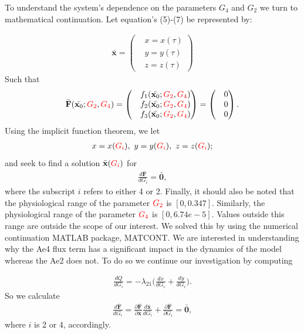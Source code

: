 \documentclass{svjour3}
\begin{document}
 To understand the system's dependence on the parameters $G_4$ and $G_2$ we turn to mathematical continuation. Let equation's (5)-(7) be represented by:\par
{\footnotesize
\begin{align*}
\bar{\textbf{x}}=
\begin{pmatrix}
& x=x(\tau) \\
& y=y(\tau) \\
& z=z(\tau)
\end{pmatrix}
\end{align*}}
Such that 
{\footnotesize
\begin{align*}
\bar{\textbf{F}}(\bar{\textbf{x}_0};{\color{red}G_{2}},{\color{red}G_{4}})=
\begin{pmatrix}
& f_1(\bar{\textbf{x}_0};{\color{red}G_{2}},{\color{red}G_{4}}) \\
& f_2(\bar{\textbf{x}_0};{\color{red}G_{2}},{\color{red}G_{4}}) \\
& f_3(\bar{\textbf{x}_0};{\color{red}G_{2}},{\color{red}G_{4}})
\end{pmatrix}=
\begin{pmatrix}
& 0 \\
& 0 \\
& 0
\end{pmatrix}.
\end{align*}}
Using the implicit function theorem, we let
{\footnotesize
\begin{align*}
x=x({\color{red}G_i}), \ y=y({\color{red}G_i}), \ z=z({\color{red}G_i});
\end{align*}}
and seek to find a solution $\bar{\textbf{x}}({\color{red}G_i})$ for
{\footnotesize
\begin{align*}
\frac{d\bar{\textbf{F}}}{dG_i}=\bar{\textbf{0}},
\end{align*} }
where the subscript $i$ refers to either 4 or 2. Finally, it should also be noted that the physiological range of the parameter ${\color{red}G_2}$ is $[0, 0.347]$. Similarly, the physiological range of the parameter ${\color{red}G_4}$ is $[0, 6.74e-5]$. Values outside this range are outside the scope of our interest. We solved this by using the numerical continuation MATLAB package, MATCONT. We are interested in understanding why the Ae4 flux term has a significant impact in the dynamics of the model whereas the Ae2 does not. To do so we continue our investigation by computing \par
\begin{align}
\frac{dQ}{dG_i}=-\lambda_{21} \Bigg( \frac{dx}{dG_i} + \frac{dy}{dG_i} \Bigg).
\end{align}
So we calculate
\begin{align}
\frac{d\bar{\textbf{F}}}{dG_i}=\frac{\partial \bar{\textbf{F}}}{\partial \bar{\textbf{x}}} \frac{d\bar{\textbf{x}}}{d G_i}+\frac{\partial \bar{\textbf{F}}}{\partial G_i} = \bar{\textbf{0}},
\end{align}
where $i$ is 2 or 4, accordingly. 
\end{document}
